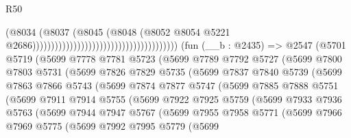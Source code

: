 \begin{lexlean}{R50}
\begin{coremodule}
                                                                        (@8034
                                                                          (@8037
                                                                            (@8045
                                                                              (@8048
                                                                                (@8052
                                                                                  @8054
                                                                                  @5221
                                                                                  @2686)))))))))))))))))))))))))))))))))))))))
    (fun (__b : @2435) =>
    @2547
      (@5701
        @5719
        (@5699
          @7778
          @7781
          @5723
          (@5699
            @7789
            @7792
            @5727
            (@5699
              @7800
              @7803
              @5731
              (@5699
                @7826
                @7829
                @5735
                (@5699
                  @7837
                  @7840
                  @5739
                  (@5699
                    @7863
                    @7866
                    @5743
                    (@5699
                      @7874
                      @7877
                      @5747
                      (@5699
                        @7885
                        @7888
                        @5751
                        (@5699
                          @7911
                          @7914
                          @5755
                          (@5699
                            @7922
                            @7925
                            @5759
                            (@5699
                              @7933
                              @7936
                              @5763
                              (@5699
                                @7944
                                @7947
                                @5767
                                (@5699
                                  @7955
                                  @7958
                                  @5771
                                  (@5699
                                    @7966
                                    @7969
                                    @5775
                                    (@5699
                                      @7992
                                      @7995
                                      @5779
                                      (@5699

\end{coremodule}
\end{lexlean}
